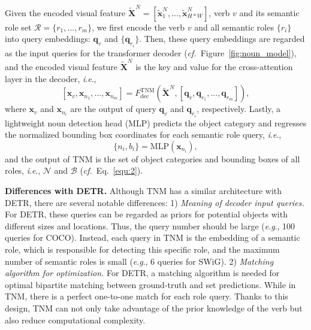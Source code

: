 \documentclass[letterpaper]{article} \usepackage{aaai22}  \usepackage{times}  \usepackage{helvet}  \usepackage{courier}  \usepackage[hyphens]{url}  \usepackage{graphicx} \urlstyle{rm} \def\UrlFont{\rm}  \usepackage{natbib}  \usepackage{caption} \DeclareCaptionStyle{ruled}{labelfont=normalfont,labelsep=colon,strut=off} \frenchspacing  \setlength{\pdfpagewidth}{8.5in}  \setlength{\pdfpageheight}{11in}
\newcommand{\ie}{\textit{i}.\textit{e}.}
\newcommand{\eg}{\textit{e}.\textit{g}.}
\newcommand{\cf}{\textit{cf.}}
\begin{document}
Given the encoded visual feature $\tilde{\bm{X}}^N = [\tilde{\bm{x}}^N_1, ..., \tilde{\bm{x}}^N_{H*W} ]$, verb $v$ and its semantic role set $\mathcal{R}=\{r_1,...,r_m\}$, we first encode the verb $v$ and all semantic roles $\{r_i\}$ into query embeddings: $\bm{q}_v$ and $\{\bm{q}_{r_i}\}$. Then, these query embeddings are regarded as the input queries for the transformer decoder (\cf~Figure~\ref{fig:noun_model}), and the encoded visual feature $\tilde{\bm{X}}^N$ is the key and value for the cross-attention layer in the decoder, \ie, 
\begin{equation} \label{equ:4}
    [\bm{x}_v, \bm{x}_{n_1}, ..., \bm{x}_{n_m}] = F^{\text{TNM}}_{\text{dec}} (\tilde{\bm{X}}^N, [\bm{q}_v, \bm{q}_{r_1}, ..., \bm{q}_{r_m}]),
\end{equation}
where $\bm{x}_v$ and $\bm{x}_{n_i}$ are the output of query $\bm{q}_v$ and $\bm{q}_{r_i}$, respectively. Lastly, a lightweight noun detection head (MLP) predicts the object category and regresses the normalized bounding box coordinates for each semantic role query, \ie, 
\begin{equation}
    \{n_i, b_i\} = \text{MLP}(\bm{x}_{n_i}),
\end{equation}
and the output of TNM is the set of object categories and bounding boxes of all roles, \ie, $\mathcal{N}$ and $\mathcal{B}$ (\cf~Eq.~\eqref{equ:2}).











\noindent\textbf{Differences with DETR.} Although TNM has a similar architecture with DETR, there are several notable differences: 1) \emph{Meaning of decoder input queries.} For DETR, these queries can be regarded as priors for potential objects with different sizes and locations. Thus, the query number should be large (\eg, 100 queries for COCO). Instead, each query in TNM is the embedding of a semantic role, which is responsible for detecting this specific role, and the maximum number of semantic roles is small (\eg, 6 queries for SWiG). 2) \emph{Matching algorithm for optimization.} For DETR, a matching algorithm is needed for optimal bipartite matching between ground-truth and set predictions. While in TNM, there is a perfect one-to-one match for each role query. Thanks to this design, TNM can not only take advantage of the prior knowledge of the verb but also reduce computational complexity.
\end{document}
